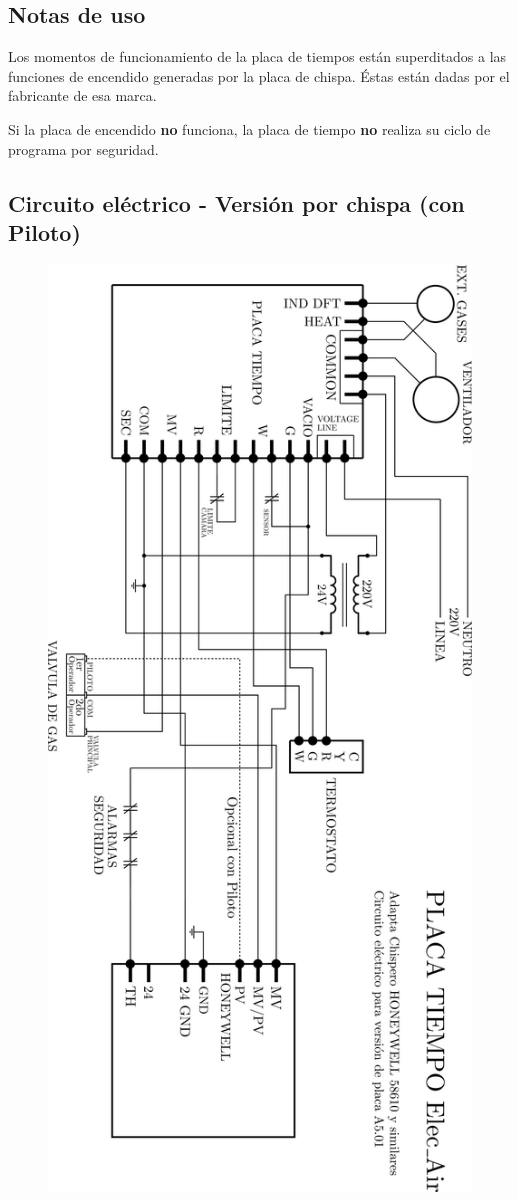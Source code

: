 \documentclass{article}
\begin{document}
\subsection*{Notas de uso}
Los momentos de funcionamiento de la placa de tiempos están superditados a las funciones de encendido generadas por la placa de chispa. Éstas están dadas por el fabricante de esa marca.\par Si la placa de encendido \textbf{no} funciona, la placa de tiempo \textbf{no} realiza su ciclo de programa por seguridad.

\newpage

\subsection*{Circuito eléctrico - Versión por chispa (con Piloto)}

\begin{figure}[H]
\centering
\includegraphics[width=0.65\linewidth]{images/PlacaTiempo_PlanoV501ConPiloto.png}
\end{figure}
\end{document}

